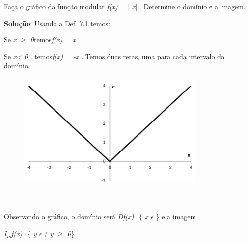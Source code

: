 \begin{texemplo}

Faça o gráfico da função modular \textit{f(x) =} $ \vert $ \textit{x}$ \vert $ . Determine o domínio e a imagem.  

\textbf{Solução}: Usando a Def. 7.1 temos:

\quad Se \textit{x $ \geq $  0}temos\textit{f(x) = x}.

\quad Se \textit{x< 0 , }temos\textit{f(x) = -x }. Temos duas retas, uma para cada intervalo do domínio.

\begin{figure}[H]
	\begin{Center}
		\includegraphics[width=3.64in,height=2.3in]{capitulos/outras_funcoes/media/image24.pdf}
	\end{Center}
\end{figure}

~~

\quad Observando o gráfico, o domínio será   \textit{Df(x)=$ \{ $ x $ \epsilon $  \textbf{ }$ \} $ } e a imagem 

\quad  \textit{I\textsubscript{m}f(x)=$ \{ $ y $ \epsilon $  }/ \textit{y $ \geq $  0$ \} $ } \qedsymbol{}
\end{texemplo}

